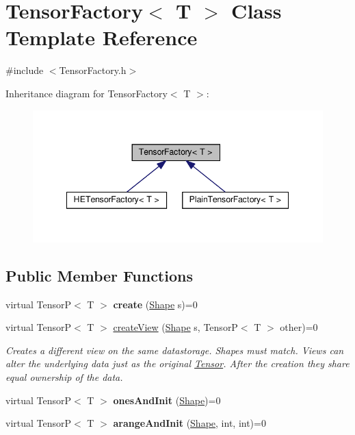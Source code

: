 \hypertarget{classTensorFactory}{}\section{Tensor\+Factory$<$ T $>$ Class Template Reference}
\label{classTensorFactory}


{\ttfamily \#include $<$Tensor\+Factory.\+h$>$}



Inheritance diagram for Tensor\+Factory$<$ T $>$\+:
\nopagebreak
\begin{figure}[H]
\begin{center}
\leavevmode
\includegraphics[width=342pt]{classTensorFactory__inherit__graph}
\end{center}
\end{figure}
\subsection*{Public Member Functions}
\begin{DoxyCompactItemize}
\item 
\mbox{\label{classTensorFactory_a45c8009a148dd01bb7fd84be786a222c}} 
virtual TensorP$<$ T $>$ {\bfseries create} (\hyperlink{classShape}{Shape} s)=0
\item 
\mbox{\label{classTensorFactory_ad14cbf4066594cc77f2fb75ee0a6ca74}} 
virtual TensorP$<$ T $>$ \hyperlink{classTensorFactory_ad14cbf4066594cc77f2fb75ee0a6ca74}{create\+View} (\hyperlink{classShape}{Shape} s, TensorP$<$ T $>$ other)=0
\begin{DoxyCompactList}\small\item\em Creates a different view on the same datastorage. Shapes must match. Views can alter the underlying data just as the original \hyperlink{classTensor}{Tensor}. After the creation they share equal ownership of the data. \end{DoxyCompactList}\item 
\mbox{\label{classTensorFactory_a07e8fa825917864f24c49772163e466e}} 
virtual TensorP$<$ T $>$ {\bfseries ones\+And\+Init} (\hyperlink{classShape}{Shape})=0
\item 
\mbox{\label{classTensorFactory_a1da615806f5f5f3b7c1c43c006ff4ee5}} 
virtual TensorP$<$ T $>$ {\bfseries arange\+And\+Init} (\hyperlink{classShape}{Shape}, int, int)=0
\end{DoxyCompactItemize}


